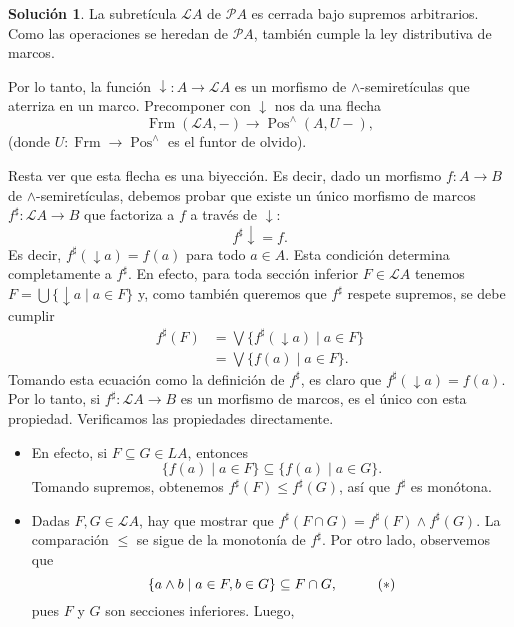 \documentclass[12pt,letterpaper,titlepage]{article}
\theoremstyle{definition}
\newtheorem*{sol}{Solución}
\newcommand\Sup{\bigvee}
\newcommand\down{{\downarrow}}
\renewcommand\inf{\wedge}
\renewcommand\cal[1]{\mathcal{#1}}
\newcommand\<{\langle}
\renewcommand\>{\rangle}
\DeclareMathOperator{\Frm}{Frm}
\DeclareMathOperator{\Pos}{Pos}
\begin{document}
\begin{sol}
    La subretícula $\cal LA$ de $\cal PA$ es cerrada bajo
    supremos arbitrarios.
    Como las operaciones se heredan de $\cal PA$, también cumple
    la ley distributiva de marcos.
    
    Por lo tanto, la función $\down:A\to\cal LA$ es un morfismo
    de $\inf$-semiretículas que aterriza en un marco.
    Precomponer con $\down$ nos da una flecha
    \[
        \Frm(\cal LA,-)\to \Pos^\inf(A,U-)
    ,\]
    (donde $U:\Frm\to\Pos^\inf$ es el funtor de olvido).
    
    Resta ver que esta flecha es una biyección.
    Es decir, dado un morfismo $f:A\to B$
    de $\inf$-semiretículas,
    debemos probar que existe un único morfismo de marcos
    $f^\sharp:\cal LA\to B$ que factoriza a $f$ a través
    de $\down$:
    \[
        f^\sharp\down = f
    .\]
    Es decir, $f^\sharp(\down a)=f(a)$ para todo $a\in A$.
    Esta condición determina completamente a $f^\sharp$.
    En efecto, para toda sección inferior $F\in\cal LA$ tenemos
    $F=\bigcup\{\down a \mid a\in F\}$ y, como también queremos
    que $f^\sharp$ respete supremos, se debe cumplir
    \begin{align*}
        f^\sharp(F)
        &= \Sup\{f^\sharp(\down a) \mid a\in F\} \\
        &= \Sup\{f(a) \mid a\in F\}.
    \end{align*}
    Tomando esta ecuación como la definición de $f^\sharp$, es
    claro que $f^\sharp(\down a)=f(a)$.
    Por lo tanto, si $f^\sharp:\cal LA\to B$ es un
    morfismo de marcos, es el único con esta propiedad.
    Verificamos las propiedades directamente.
    \begin{itemize}
        \item En efecto, si $F\subseteq G\cal\in LA$, entonces 
        \[
            \{f(a) \mid a\in F\} \subseteq \{f(a) \mid a\in G\}
        .\]
        Tomando supremos, obtenemos
        $f^\sharp(F)\leq f^\sharp(G)$, así que $f^\sharp$ es
        monótona.
        \item
        Dadas $F,G\in\cal LA$, hay que mostrar
        que $f^\sharp(F\cap G)=f^\sharp(F)\inf f^\sharp(G)$.
        La comparación $\leq$ se sigue de la monotonía de
        $f^\sharp$.
        Por otro lado, observemos que
        \[
            \{ a\inf b \mid a\in F, b\in G\}
            \subseteq F\cap G,
            \hspace{10mm} (*)
        \]
        pues $F$ y $G$ son secciones inferiores.
        Luego,
        \begin{align*}

\end{align*}
\end{itemize}
\end{sol}
\end{document}
